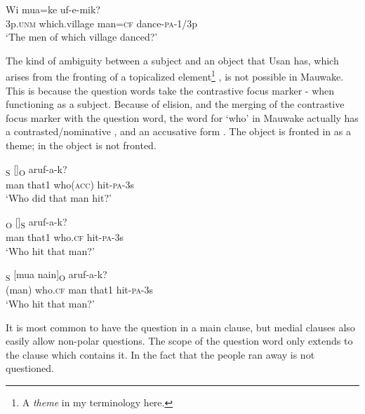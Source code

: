 \ea%
\label{ex:7:x1174}
\gll Wi    mua=ke  uf-e-mik? \\
3p.\textsc{unm}  which.village  man=\textsc{cf}  dance-\textsc{pa}-1/3p      \\
\glt `The men of which village danced?'
\z





The kind of ambiguity between a subject and an object that Usan has, which arises from the fronting of a topicalized element\footnote{A \textit{theme} in my terminology here.} \citep[294]{Reesink1987}, is not possible in Mauwake. This is because the question words take the contrastive focus marker \nobreakdash-  when functioning as a subject. Because of elision, and the merging of the contrastive focus marker with the question word, the word for `who' in Mauwake actually has a contrasted/nominative ,  and an accusative form . The object is fronted in  as a theme; in  the object is not fronted.

\ea%
\label{ex:7:x1170}
\textsubscript{S}  []\textsubscript{O}  aruf-a-k? \\
man  that1  who(\textsc{acc})  hit-\textsc{pa}-3s      \\
\glt `Who did that man hit?'
\z





\ea%
\label{ex:7:x1171}
\textsubscript{O}  []\textsubscript{S}  aruf-a-k? \\
man  that1  who.\textsc{cf}  hit-\textsc{pa}-3s      \\
\glt `Who hit that man?'
\z





\ea%
\label{ex:7:x1172}
\textsubscript{S}  [mua  nain]\textsubscript{O}  aruf-a-k? \\
(man)  who.\textsc{cf}  man  that1  hit-\textsc{pa}-3s      \\
\glt `Who hit that man?'
\z





It is most common to have the question in a main clause, but medial clauses also easily allow non-polar questions. The scope of the question word only extends to the clause which contains it. In  the fact that the people ran away is not questioned.

